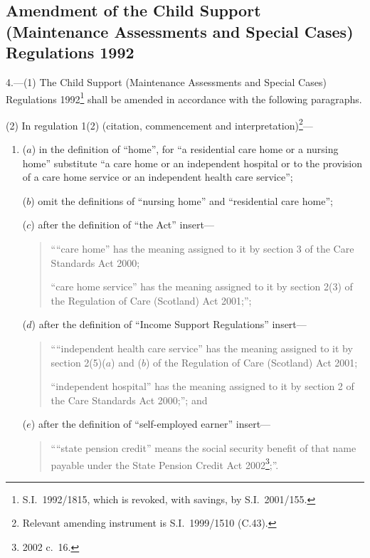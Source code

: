 \documentclass[12pt,a4paper]{article}
\begin{document}
\subsection[4. Amendment of the Child Support (Maintenance Assessments and Special Cases) Regulations 1992]{Amendment of the Child Support (Maintenance Assessments and Special Cases) Regulations 1992}

4.---(1)  The Child Support (Maintenance Assessments and Special Cases) Regulations 1992\footnote{S.I.\ 1992/1815, which is revoked, with savings, by S.I.\ 2001/155.} shall be amended in accordance with the following paragraphs.

(2) In regulation 1(2) (citation, commencement and interpretation)\footnote{Relevant amending instrument is S.I.\ 1999/1510 (C.43).}—
\begin{enumerate}\item[]
($a$) in the definition of “home”, for “a residential care home or a nursing home” substitute “a care home or an independent hospital or to the provision of a care home service or an independent health care service”;

($b$) omit the definitions of “nursing home” and “residential care home”;

($c$) after the definition of “the Act” insert—
\begin{quotation}
““care home” has the meaning assigned to it by section 3 of the Care Standards Act 2000;

“care home service” has the meaning assigned to it by section 2(3) of the Regulation of Care (Scotland) Act 2001;”;
\end{quotation}

($d$) after the definition of “Income Support Regulations” insert—
\begin{quotation}
““independent health care service” has the meaning assigned to it by section 2(5)($a$)  and ($b$)  of the Regulation of Care (Scotland) Act 2001;

“independent hospital” has the meaning assigned to it by section 2 of the Care Standards Act 2000;”; and
\end{quotation}

($e$) after the definition of “self-employed earner” insert—
\begin{quotation}
““state pension credit” means the social security benefit of that name payable under the State Pension Credit Act 2002\footnote{2002 c.\ 16.};”.
\end{quotation}
\end{enumerate}
\end{document}
